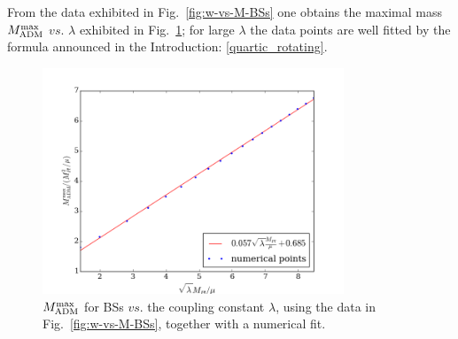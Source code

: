 From the data exhibited in Fig.~\ref{fig:w-vs-M-BSs} one obtains the  maximal mass $M_{\rm ADM}^{\rm max}$ $vs.$ $\lambda$ exhibited in Fig.~\ref{max_mass_0}; for large $\lambda$ the data points are well fitted by the formula announced in the Introduction: \eqref{quartic_rotating}.
%
\begin{figure}[h!]
  \begin{center}
    \includegraphics[width=9cm]{papers/selfInteractions/max-mass.png}
  \end{center}
  \caption{$M_{\rm ADM}^{\rm max}$ for BSs $vs.$ the coupling constant $\lambda$, using the data in Fig.~\ref{fig:w-vs-M-BSs}, together with a numerical fit.}
  \label{max_mass_0}
\end{figure}
%






